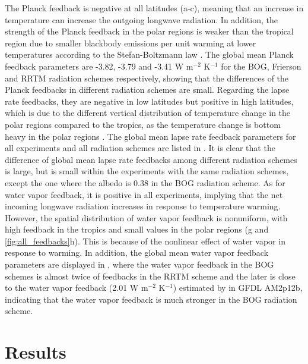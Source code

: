 The Planck feedback  is negative at all latitudes (a-c), meaning that an increase in temperature can increase the outgoing longwave radiation. In addition, the strength of the Planck feedback in the polar regions is weaker than the tropical region due to smaller blackbody emissions per unit warming at lower temperatures according to the Stefan-Boltzmann law \citep{Goosse2018}. The global mean Planck feedback parameters are -3.82, -3.79 and -3.41 W m$^{-2}$ K$^{-1}$ for the BOG, Frierson and RRTM radiation schemes respectively, showing that the differences of the Planck feedbacks in different radiation schemes are small. Regarding the lapse rate feedbacks, they are negative in low latitudes but positive in high latitudes, which is due to the different vertical distribution of temperature change in the polar regions compared to the tropics, as the temperature change is bottom heavy in the polar regions \citep{Pithan2014}. The global mean lapse rate feedback parameters for all experiments and all radiation schemes are listed in . It is clear that the difference of global mean lapse rate feedbacks among different radiation schemes is large, but is small within the experiments with the same radiation schemes, except the one where the albedo is 0.38 in the BOG radiation scheme. As for water vapor feedback, it is positive in all experiments, implying that the net incoming longwave radiation increases in response to temperature warming. However, the spatial distribution of water vapor feedback is nonuniform, with high feedback in the tropics and small values in the polar regions (g and \ref{fig:all_feedbacks}h). This is because of the nonlinear effect of water vapor in response to warming. In addition, the global mean water vapor feedback parameters are displayed in , where the water vapor feedback in the BOG schemes is almost twice of feedbacks in the RRTM scheme and the later is close to the water vapor feedback (2.01 W m$^{-2}$ K$^{-1}$) estimated by \cite{Soden2008} in GFDL AM2p12b, indicating that the water vapor feedback is much stronger in the BOG radiation scheme.


\section{Results}
\label{sec:polar_amiplification_results}

